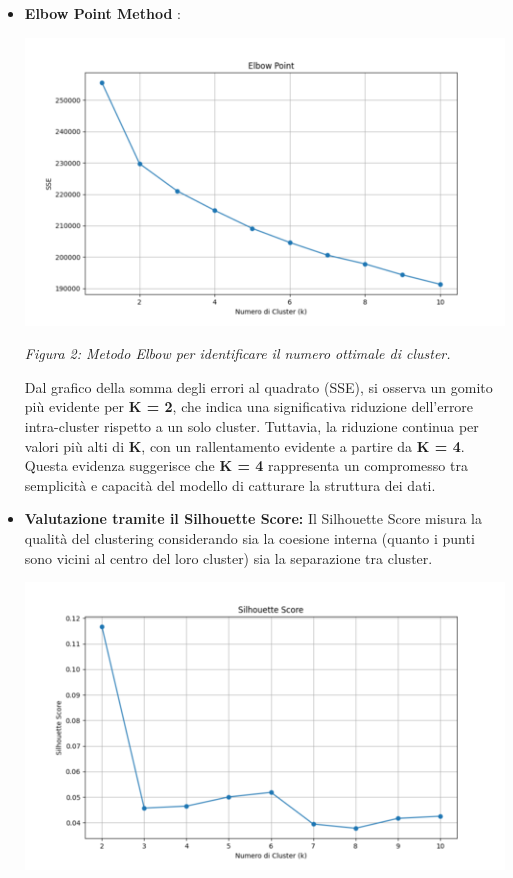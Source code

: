 \documentclass[a4paper,12pt]{article}
\begin{document}
		\begin{itemize}
			\item \textbf{Elbow Point Method} : 
				\begin{center}
					\includegraphics[]{./grafici/elbow_point.png}

\textit{Figura 2: Metodo Elbow per identificare il numero ottimale di cluster.}
				\end{center}


Dal grafico della somma degli errori al quadrato (SSE), si osserva un gomito più evidente per \textbf{K = 2}, che indica una significativa riduzione dell'errore intra-cluster rispetto a un solo cluster. Tuttavia, la riduzione continua per valori più alti di \textbf{K}, con un rallentamento evidente a partire da \textbf{K = 4}. Questa evidenza suggerisce che \textbf{K = 4} rappresenta un compromesso tra semplicità e capacità del modello di catturare la struttura dei dati.

\newpage
			\item \textbf{Valutazione tramite il Silhouette Score: } Il Silhouette Score misura la qualità del clustering considerando sia la coesione interna (quanto i punti sono vicini al centro del loro cluster) sia la separazione tra cluster.

	\begin{center}
		\includegraphics[]{./grafici/silhouette_score.png}


\end{center}
\end{itemize}
\end{document}
